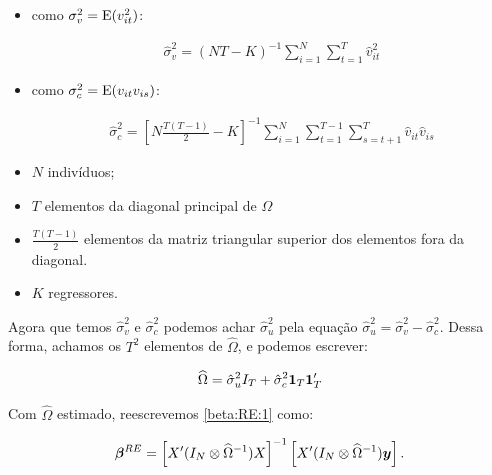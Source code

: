 \documentclass[11pt, oneside, a4paper, article]{article}
\numberwithin{equation}{section}
\begin{document}
\begin{itemize}\itemsep0pt
\item 
como $\sigma_{v}^{2} = \text{E}(v_{it}^{2})$:

\vspace{-1.5 em}
\begin{align*}
\hat{\sigma}_{v}^{2} =
(NT - K)^{-1} 
\sum_{i=1}^{N}
\sum_{t=1}^{T}
\hat{v}_{it}^2
\end{align*}
\vspace{-1.5 em}

\item 
como $\sigma_{c}^{2} = \text{E}(v_{it} v_{is})$:

\vspace{-1.5 em}
\begin{align*}
\hat{\sigma}_{c}^{2} =
\left[ N \frac{T ( T-1 )}{2} - K  \right]^{-1}
\sum_{i=1}^{N}
\sum_{t=1}^{T-1}
\sum_{s=t+1}^{T}
\hat{v}_{it} \hat{v}_{is}
\end{align*}
\vspace{-1.5 em}

\item $N$ indivíduos;

\item $T$ elementos da diagonal principal de $\Omega$

\item $\frac{T ( T - 1)}{2}$ elementos da matriz triangular superior dos elementos fora da diagonal.

\item $K$ regressores.
\end{itemize}

Agora que temos $\hat{\sigma}^2_{v}$ e $\hat{\sigma}^2_{c}$ podemos achar $\hat{\sigma}^{2}_{u}$ pela equação $\boxed{\hat{\sigma}_{u}^{2} = \hat{\sigma}_{v}^{2} - \hat{\sigma}_{c}^{2}}$.
Dessa forma, achamos os $T^2$ elementos de $\widehat{\Omega}$, e podemos escrever:

\vspace{-1 em}
\begin{align*}
\widehat{\Omega}
= 
\hat{\sigma}^{2}_{u} I_{T} + \hat{\sigma}_{c}^{2} \boldsymbol{1}_{T} \boldsymbol{1}_{T}'
\end{align*}

Com $\widehat{\Omega}$ estimado, reescrevemos \eqref{beta:RE:1} como:

\vspace{-1 em}
\begin{align} \label{beta:RE:2}
\boldsymbol{\beta}^{RE} = 
\left[ X' (I_{N} \otimes \widehat{\Omega}^{-1}) X \right]^{-1}
\left[ X' (I_{N} \otimes \widehat{\Omega}^{-1}) \boldsymbol{y} \right].
\end{align}
\end{document}
